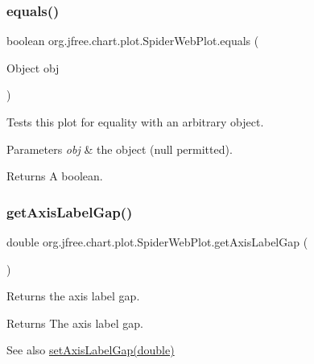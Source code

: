 \subsubsection{\texorpdfstring{equals()}{equals()}}
{\footnotesize\ttfamily boolean org.\+jfree.\+chart.\+plot.\+Spider\+Web\+Plot.\+equals (\begin{DoxyParamCaption}\item[{Object}]{obj }\end{DoxyParamCaption})}

Tests this plot for equality with an arbitrary object.


\begin{DoxyParams}{Parameters}
{\em obj} & the object ({\ttfamily null} permitted).\\
\hline
\end{DoxyParams}
\begin{DoxyReturn}{Returns}
A boolean. 
\end{DoxyReturn}
\mbox{\label{classorg_1_1jfree_1_1chart_1_1plot_1_1_spider_web_plot_a7b9f148b29a57cb490d788a6b6208e38}} 
\subsubsection{\texorpdfstring{get\+Axis\+Label\+Gap()}{getAxisLabelGap()}}
{\footnotesize\ttfamily double org.\+jfree.\+chart.\+plot.\+Spider\+Web\+Plot.\+get\+Axis\+Label\+Gap (\begin{DoxyParamCaption}{ }\end{DoxyParamCaption})}

Returns the axis label gap.

\begin{DoxyReturn}{Returns}
The axis label gap.
\end{DoxyReturn}
\begin{DoxySeeAlso}{See also}
\mbox{\hyperlink{classorg_1_1jfree_1_1chart_1_1plot_1_1_spider_web_plot_a3b64f9217fe3d9ecc2ee4f3bed7f2d6b}{set\+Axis\+Label\+Gap(double)}} 
\end{DoxySeeAlso}
\mbox{\label{classorg_1_1jfree_1_1chart_1_1plot_1_1_spider_web_plot_a552604854e1b6d275f5dd2d94543ca7c}} 
